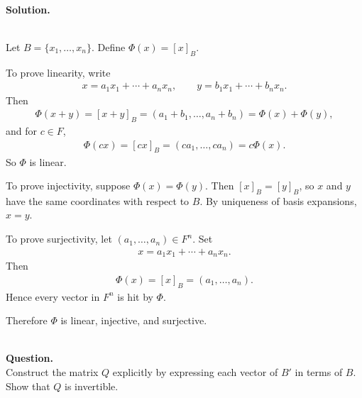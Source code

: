 \documentclass{article}
\begin{document}
\noindent\\
\textbf{Solution.}\\
\quad\\
\begin{mdframed}[linewidth=1pt]
Let $B=\{x_1,\dots,x_n\}$. Define $\Phi(x)=[x]_B$.

To prove linearity, write
\begin{align*}
x=a_1x_1+\cdots+a_nx_n,\qquad y=b_1x_1+\cdots+b_nx_n.
\end{align*}
Then
\begin{align*}
\Phi(x+y)=[x+y]_B=(a_1+b_1,\dots,a_n+b_n)=\Phi(x)+\Phi(y),
\end{align*}
and for $c\in F$,
\begin{align*}
\Phi(cx)=[cx]_B=(ca_1,\dots,ca_n)=c\Phi(x).
\end{align*}
So $\Phi$ is linear.

To prove injectivity, suppose $\Phi(x)=\Phi(y)$. Then $[x]_B=[y]_B$, so $x$ and $y$ have the same coordinates with respect to $B$. By uniqueness of basis expansions, $x=y$.

To prove surjectivity, let $(a_1,\dots,a_n)\in F^n$. Set
\begin{align*}
x=a_1x_1+\cdots+a_nx_n.
\end{align*}
Then
\begin{align*}
\Phi(x)=[x]_B=(a_1,\dots,a_n).
\end{align*}
Hence every vector in $F^n$ is hit by $\Phi$.

Therefore $\Phi$ is linear, injective, and surjective.
\end{mdframed}

\bigskip


\hfill \break  $~\!\!$ \dotfill \medskip \\
\textbf{Question.}\\
Construct the matrix $Q$ explicitly by expressing each vector of $B'$ in terms of $B$. Show that $Q$ is invertible.
\end{document}
